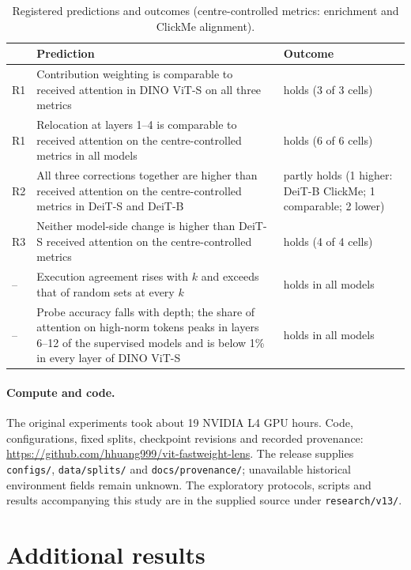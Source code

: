 \begin{table}[!htbp]
\caption{Registered predictions and outcomes (centre-controlled metrics: enrichment and ClickMe alignment).}
\label{tab:app-registered}
\centering\footnotesize
\setlength{\tabcolsep}{4pt}
\begin{tabular}{@{}l>{\raggedright\arraybackslash}p{3.55in}>{\raggedright\arraybackslash}p{1.35in}@{}}
\toprule
 & Prediction & Outcome\\
\midrule
R1 & Contribution weighting is comparable to received attention in DINO ViT-S on all three metrics & holds (3 of 3 cells)\\
R1 & Relocation at layers 1--4 is comparable to received attention on the centre-controlled metrics in all models & holds (6 of 6 cells)\\
R2 & All three corrections together are higher than received attention on the centre-controlled metrics in DeiT-S and DeiT-B & partly holds (1 higher: DeiT-B ClickMe; 1 comparable; 2 lower)\\
R3 & Neither model-side change is higher than DeiT-S received attention on the centre-controlled metrics & holds (4 of 4 cells)\\
\midrule
-- & Execution agreement rises with $k$ and exceeds that of random sets at every $k$ & holds in all models\\
-- & Probe accuracy falls with depth; the share of attention on high-norm tokens peaks in layers 6--12 of the supervised models and is below 1\% in every layer of DINO ViT-S & holds in all models\\
\bottomrule
\end{tabular}
\end{table}

\paragraph{Compute and code.} The original experiments took about 19 NVIDIA L4 GPU hours. Code, configurations, fixed splits, checkpoint revisions and recorded provenance: \url{https://github.com/hhuang999/vit-fastweight-lens}. The release supplies \texttt{configs/}, \texttt{data/splits/} and \texttt{docs/provenance/}; unavailable historical environment fields remain unknown. The exploratory protocols, scripts and results accompanying this study are in the supplied source under \texttt{research/v13/}.

\section{Additional results}
\label{app:more}


